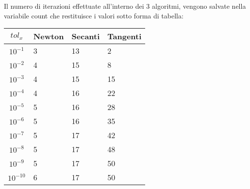 
\begin{flushleft}
Il numero di iterazioni effettuate all'interno dei 3 algoritmi, vengono salvate nella variabile count che restituisce i valori sotto forma di tabella:
\end{flushleft}

\begin{tabular}{|c|l|l|l|}
$tol_x$ & Newton & Secanti & Tangenti \\
\hline
$10^{-1}$ & 3 & 13 & 2 \\
$10^{-2}$ & 4 & 15 & 8 \\
$10^{-3}$ & 4 & 15 & 15 \\
$10^{-4}$ & 4 & 16 & 22 \\
$10^{-5}$ & 5 & 16 & 28 \\
$10^{-6}$ & 5 & 16 & 35 \\
$10^{-7}$ & 5 & 17 & 42 \\
$10^{-8}$ & 5 & 17 & 48 \\
$10^{-9}$ & 5 & 17 & 50 \\
$10^{-10}$ & 6 & 17 & 50 \\
\hline
\end{tabular}